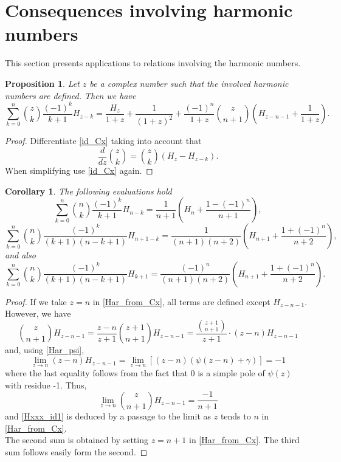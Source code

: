 \documentclass[11pt,reqno]{amsart}
\theoremstyle{plain}
\numberwithin{equation}{section}
\newtheorem{proposition}[thm]{Proposition}
\newtheorem{corollary}[thm]{Corollary}
\begin{document}
\section{Consequences involving harmonic numbers}

This section presents applications to relations involving the harmonic numbers.

\begin{proposition}
Let $z$ be a complex number such that the involved harmonic numbers are defined. Then we have
\begin{equation}\label{Har_from_Cx}
\sum_{k=0}^n \binom{z}{k} \frac{(-1)^k}{k+1} H_{z-k} 
= \frac{H_z}{1+z} + \frac{1}{(1+z)^2} + \frac{(-1)^n}{1+z} \binom{z}{n+1} \left ( H_{z-n-1} + \frac{1}{1+z} \right ).
\end{equation}
\end{proposition}
\begin{proof}
Differentiate \eqref{id_Cx} taking into account that
$$\frac{d}{dz} \binom{z}{k} = \binom{z}{k} (H_z - H_{z-k}).$$
When simplifying use \eqref{id_Cx} again.
\end{proof}

\begin{corollary}
The following evaluations hold
\begin{equation}\label{Hxxx_id1}
\sum_{k=0}^n \binom{n}{k} \frac{(-1)^k}{k+1} H_{n-k} = \frac{1}{n+1}\left ( H_n + \frac{1-(-1)^n}{n+1}\right ),
\end{equation}
\begin{equation}\label{Hxxx_id2}
\sum_{k=0}^n \binom{n}{k} \frac{(-1)^k}{(k+1)(n-k+1)} H_{n+1-k} = \frac{1}{(n+1)(n+2)}\left ( H_{n+1} + \frac{1+(-1)^n}{n+2}\right ),
\end{equation}
and also
\begin{equation}\label{Hxxx_id3}
\sum_{k=0}^n \binom{n}{k} \frac{(-1)^k}{(k+1)(n-k+1)} H_{k+1} = \frac{(-1)^n}{(n+1)(n+2)}\left ( H_{n+1} + \frac{1+(-1)^n}{n+2}\right ).
\end{equation}
\end{corollary}
\begin{proof}
If we take $z=n$ in \eqref{Har_from_Cx}, all terms are defined except $H_{z-n-1}$. However, we have
\[\binom{z}{n+1}H_{z-n-1}=\frac{z-n}{z+1}\binom{z+1}{n+1}H_{z-n-1}=\frac{\binom{z+1}{n+1}}{z+1}\cdot (z-n)H_{z-n-1}\]
and, using \eqref{Har_psi},
\[\lim_{z\to n} (z-n)H_{z-n-1}=\lim_{z\to n} [(z-n)(\psi(z-n)+\gamma)]=-1\]
where the last equality follows from the fact that $0$ is a simple pole of $\psi(z)$ with residue -1. Thus, 
\[\lim_{z\to n}\binom{z}{n+1}H_{z-n-1}=\frac{-1}{n+1}\]
and \eqref{Hxxx_id1} is deduced by a passage to the limit as $z$ tends to $n$ in \eqref{Har_from_Cx}.\\
The second sum is obtained by setting $z=n+1$ in \eqref{Har_from_Cx}. The third sum follows easily form the second.
\end{proof}
\end{document}
